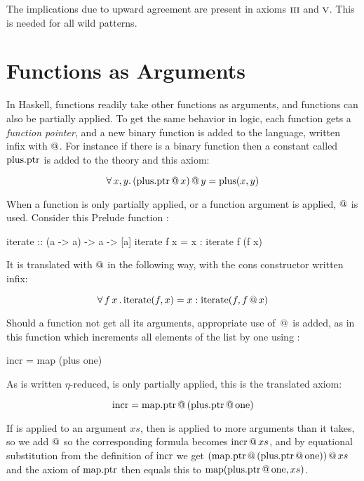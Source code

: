 The implications due to upward agreement are present in axioms
$\romnodot{3}$ and $\romnodot{5}$. This is needed for all wild
patterns.

\section{Functions as Arguments}

In Haskell, functions readily take other functions as arguments, and
functions can also be partially applied. To get the same behavior in
logic, each function gets a \emph{function pointer}, and a new binary
function is added to the language, written infix with $@$.  For
instance if there is a binary function  then a constant
called $\mathrm{plus.ptr}$ is added to the theory and this axiom:

\begin{equation*}
\forall \, x , y . \,  (\mathrm{plus.ptr} \, @ \, x) \, @ \, y = \mathrm{plus}(x,y)
\end{equation*}

When a function is only partially applied, or a function argument is
applied, $@$ is used. Consider this Prelude function :

\begin{code}
iterate :: (a -> a) -> a -> [a]
iterate f x = x : iterate f (f x)
\end{code}

It is translated with $@$ in the following way, with the cons
constructor \hs{:} written infix:

\begin{equation*}
\forall \, f \, x \, . \, \mathrm{iterate}(f,x) = x : \mathrm{iterate}(f,f \, @ \, x)
\end{equation*}

Should a function not get all its arguments, appropriate use of $\, @ \, $ is
added, as in this function which increments all elements of the list
by one using :

\begin{code}
incr = map (plus one)
\end{code}

As  is written $\eta$-reduced,  is
only partially applied, this is the translated axiom:

\begin{equation*}
\mathrm{incr} = \mathrm{map.ptr} \, @ \, (\mathrm{plus.ptr} \, @ \, \mathrm{one})
\end{equation*}

If  is applied to an argument $xs$, then  is applied
to more arguments than it takes, so we add $@$ so the
corresponding formula becomes $\mathrm{incr} \, @ \, xs$, and by equational
substitution from the definition of $\mathrm{incr}$ we get
$(\mathrm{map.ptr} \, @ \, (\mathrm{plus.ptr} \, @ \, \mathrm{one})) \, @ \, xs$ and
the axiom of $\mathrm{map.ptr}$ then equals this to
$\mathrm{map}(\mathrm{plus.ptr} \, @ \, \mathrm{one},xs)$.

